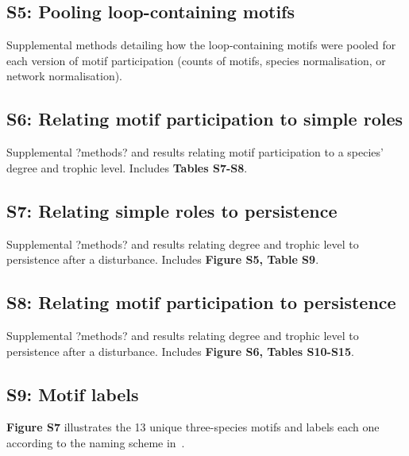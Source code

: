 \documentclass[12pt]{article}
\begin{document}
    \subsection*{S5: Pooling loop-containing motifs}

    	Supplemental methods detailing how the loop-containing motifs were pooled for each version of motif participation (counts of motifs, species normalisation, or network normalisation).


    \subsection*{S6: Relating motif participation to simple roles}

    	Supplemental ?methods? and results relating motif participation to a species' degree and trophic level. Includes \textbf{Tables S7-S8}.


    \subsection*{S7: Relating simple roles to persistence}

        Supplemental ?methods? and results relating degree and trophic level to persistence after a disturbance. Includes \textbf{Figure S5, Table S9}.


    \subsection*{S8: Relating motif participation to persistence}

    	Supplemental ?methods? and results relating degree and trophic level to persistence after a disturbance. Includes \textbf{Figure S6, Tables S10-S15}.

    \subsection*{S9: Motif labels}
        
        \textbf{Figure S7} illustrates the 13 unique three-species motifs and labels each one according to the naming scheme in~\citet{Stouffer2007}.
\end{document}
